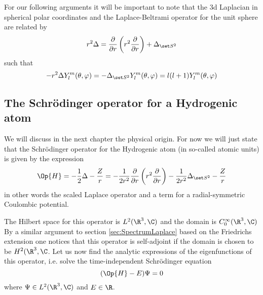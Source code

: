 For our following arguments it will be important to note
that the 3d Laplacian in spherical polar coordinates
and the Laplace-Beltrami operator for the unit sphere
are related by
\newcommand{\laplaceRadial}{\frac{\partial}{\partial r} \left( r^2 \frac{\partial}{\partial r} \right)}
\begin{equation}
r^2 \Delta = \laplaceRadial + \laplaceSphere
	\label{eqn:LaplaceCorrespondance}
\end{equation}
such that
\begin{equation}
	- r^2 \Delta Y_l^m(\theta, \varphi) = -\laplaceSphere Y_l^m(\theta, \varphi) = l (l+1) Y_l^m(\theta, \varphi)
	\label{eqn:LaplaceSphericalHarmonic}
\end{equation}


\subsection{The Schrödinger operator for a Hydrogenic atom}
\label{sec:HydrogenAtom}
We will discuss in the next chapter the physical origin.
For now we will just state that the Schrödinger operator for the Hydrogenic atom
(in so-called atomic units)
is given by the expression
\begin{equation}
	\Op{H} = - \frac12 \Delta - \frac{Z}{r} = -\frac{1}{2r^2} \laplaceRadial -\frac{1}{2r^2} \laplaceSphere - \frac{Z}{r}
	\label{eqn:HydrogenOperator}
\end{equation}
in other words the scaled Laplace operator and a term for a radial-symmetric Coulombic
potential.

The Hilbert space for this operator is $L^2(\R^3, \C)$
and the domain is $C^\infty_0(\R^3, \C)$
By a similar argument to section \vref{sec:SpectrumLaplace} based on the
Friedrichs extension one notices that this operator is self-adjoint
if the domain is chosen to be $H^2(\R^3, \C$.
Let us now find the analytic expressions of the eigenfunctions of this operator,
i.e. solve the time-independent Schrödinger equation
\begin{equation}
	( \Op{H} - E ) \Psi = 0
	\label{eqn:HydrogenEigenproblem}
\end{equation}
where $\Psi \in L^2(\R^3, \C)$ and $E \in \R$.

